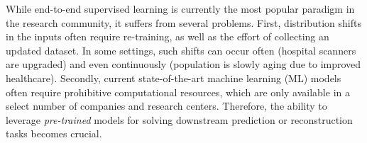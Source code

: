 \documentclass{article}
\begin{document}
While end-to-end supervised learning is currently the most popular paradigm in the research community, it suffers from several problems. First, distribution shifts in the inputs often require re-training, as well as the effort of collecting an updated dataset. In some settings, such shifts can occur often (hospital scanners are upgraded) and even continuously (population is slowly aging due to improved healthcare).  Secondly, current state-of-the-art machine learning (ML) models often require prohibitive computational resources, which are only available in a select number of companies and research centers. Therefore, the ability to leverage \emph{pre-trained} models for solving downstream prediction or reconstruction tasks becomes crucial. 





\newcommand{\diagfld}{images/diagram}
\newcommand{\fstikz}[1]{\footnotesize{#1}}

\newcommand{\figscl}{0.8}
\end{document}
